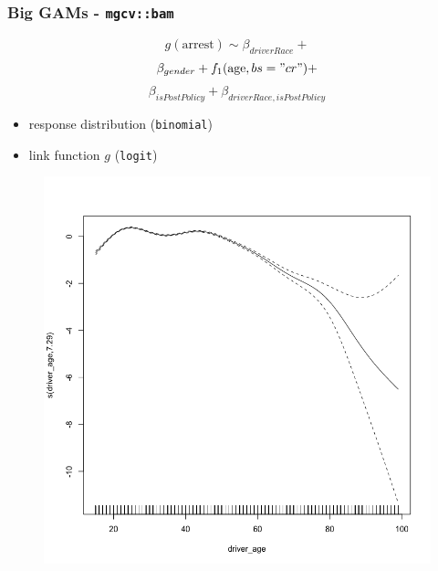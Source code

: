 \documentclass{beamer}
\begin{document}
\begin{frame}
\frametitle{Big GAMs - \texttt{mgcv::bam}}


\begin{multicols}{2}
$$g(\text{arrest}) \sim \beta_{driverRace} + $$
$$ \beta_{gender} + f_1(\text{age}, bs = "cr") +$$
$$\beta_{isPostPolicy}+ \beta_{driverRace, isPostPolicy}$$


\begin{itemize}
\item response distribution (\texttt{binomial}) 
\item link function $g$ (\texttt{logit})
\end{itemize}

\columnbreak

\begin{figure}
\includegraphics[scale=.2]{figures/smoothAge}
\end{figure}

\end{multicols}

\end{frame}
\end{document}
